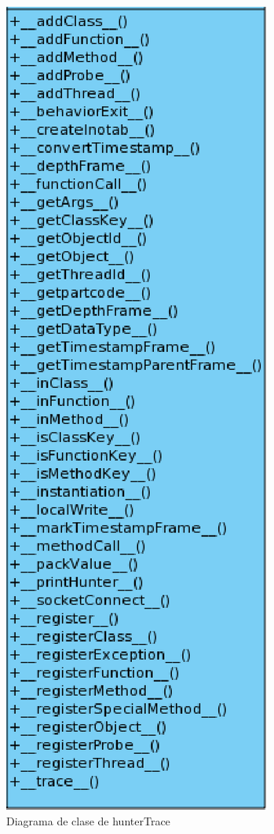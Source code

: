 \documentclass[12pt,legalpaper]{report}
\begin{document}
\begin{figure}
\begin{minipage}[c]{5.5cm}
\includegraphics[scale=0.6]{images/Clases/hunterTraceMethods.eps}
\end{minipage}
\caption{Diagrama de clase de hunterTrace}
\end{figure}
\end{document}
